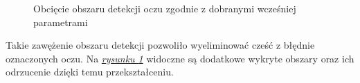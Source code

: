 \begin{figure}[!h]
    \begin{center}
        \hspace{8mm}
    \end{center}
    \caption{Obcięcie obszaru detekcji oczu zgodnie z dobranymi wcześniej parametrami}
    \label{fig:eye_crop}
\end{figure}

Takie zawężenie obszaru detekcji pozwoliło wyeliminować cześć z błędnie oznaczonych oczu. Na \hyperref[{fig:eye_crop}]{\textit{rysunku \ref{fig:eye_crop}}} widoczne są dodatkowe wykryte obszary oraz ich odrzucenie dzięki temu przekształceniu.

